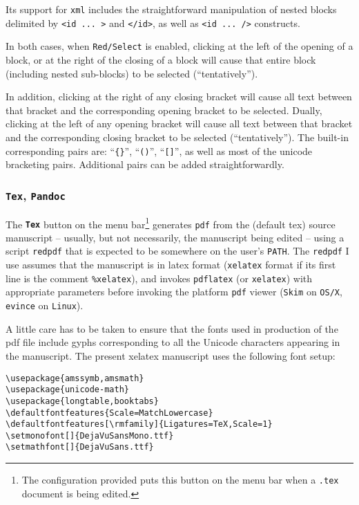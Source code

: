 \documentclass[11pt,a4paper]{article}
\begin{document}
Its support for \texttt{xml} includes the straightforward manipulation
of nested blocks delimited by
\texttt{\textless{}id\ ...\ \textgreater{}} and
\texttt{\textless{}/id\textgreater{}}, as well as
\texttt{\textless{}id\ ...\ /\textgreater{}} constructs.

In both cases, when \texttt{Red/Select} is enabled, clicking at the left
of the opening of a block, or at the right of the closing of a block
will cause that entire block (including nested sub-blocks) to be
selected (``tentatively'').

In addition, clicking at the right of any closing bracket will cause all
text between that bracket and the corresponding opening bracket to be
selected. Dually, clicking at the left of any opening bracket will cause
all text between that bracket and the corresponding closing bracket to
be selected (``tentatively''). The built-in corresponding pairs are:
``\texttt{\{\}}'', ``\texttt{()}'', ``\texttt{{[}{]}}'', as well as most
of the unicode bracketing pairs. Additional pairs can be added
straightforwardly.



\hypertarget{tex-pandoc}{%
\subsubsection{\texorpdfstring{\texttt{Tex},
\texttt{Pandoc}}{Tex, Pandoc}}\label{tex-pandoc}}

The \textbf{\texttt{Tex}} button on the menu bar\footnote{The
configuration provided puts this button on the menu bar when a
\texttt{.tex} document is being edited.} generates \texttt{pdf}
from the (default tex) source manuscript -- usually, but not
necessarily, the manuscript being edited -- using a script
\texttt{redpdf} that is expected to be somewhere on the user's
\texttt{PATH}. The \texttt{redpdf} I use assumes that the manuscript
is in latex format (\texttt{xelatex} format if its first line is
the comment \texttt{\%xelatex}), and invokes \texttt{pdflatex} (or
\texttt{xelatex}) with appropriate parameters before invoking the
platform \texttt{pdf} viewer (\texttt{Skim} on \texttt{OS/X},
\texttt{evince} on \texttt{Linux}).

A little care has to be taken to ensure that the fonts used in
production of the pdf file include gyphs corresponding to all the
Unicode characters appearing in the manuscript. The present xelatex
manuscript uses the following font setup:

\begin{verbatim}
\usepackage{amssymb,amsmath}
\usepackage{unicode-math}
\usepackage{longtable,booktabs}
\defaultfontfeatures{Scale=MatchLowercase}
\defaultfontfeatures[\rmfamily]{Ligatures=TeX,Scale=1}
\setmonofont[]{DejaVuSansMono.ttf}
\setmathfont[]{DejaVuSans.ttf}
\end{verbatim}
\end{document}
